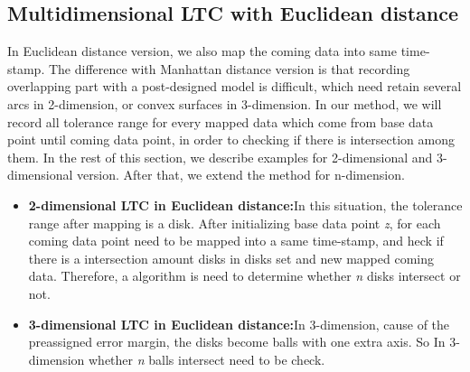 \documentclass[10pt, conference, compsocconf]{IEEEtran}
\begin{document}
\subsection{Multidimensional LTC with Euclidean distance} 
In Euclidean distance version, we also map the coming data into same time-stamp. The difference with Manhattan distance version is that recording overlapping part with a post-designed model is difficult, which need retain several arcs in 2-dimension, or convex surfaces in 3-dimension. In our method, we will record all tolerance range for every mapped data which come from base data point until coming data point, in order to checking if there is intersection among them. In the rest of this section, we describe examples for 2-dimensional and 3-dimensional version. After that, we extend the method for n-dimension.
\begin{itemize}
\item \textbf{2-dimensional LTC in Euclidean distance:}In this situation, the tolerance range after mapping is a disk. After initializing base data point \textit{z}, for each coming data point need to be mapped into a same time-stamp, and heck if there is a intersection amount disks in disks set and new mapped coming data. Therefore, a algorithm is need to determine whether \textit{n} disks intersect or not.
\item \textbf{3-dimensional LTC in Euclidean distance:}In 3-dimension, cause of the preassigned error margin, the disks become balls with one extra axis. So In 3-dimension whether \textit{n} balls intersect need to be check.
\end{itemize}
\end{document}
